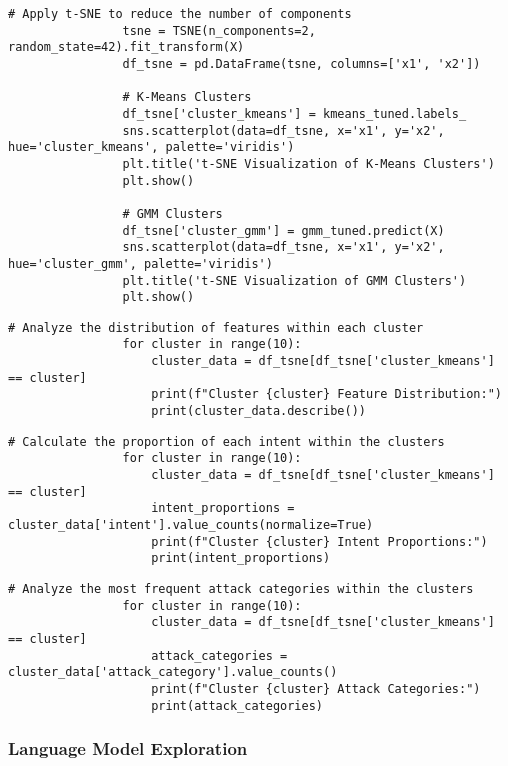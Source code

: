             \begin{lstlisting}[caption={t-SNE Visualization of Clusters}, label={lst:tsne_visualization}]
                # Apply t-SNE to reduce the number of components
                tsne = TSNE(n_components=2, random_state=42).fit_transform(X)
                df_tsne = pd.DataFrame(tsne, columns=['x1', 'x2'])
                
                # K-Means Clusters
                df_tsne['cluster_kmeans'] = kmeans_tuned.labels_
                sns.scatterplot(data=df_tsne, x='x1', y='x2', hue='cluster_kmeans', palette='viridis')
                plt.title('t-SNE Visualization of K-Means Clusters')
                plt.show()
                
                # GMM Clusters
                df_tsne['cluster_gmm'] = gmm_tuned.predict(X)
                sns.scatterplot(data=df_tsne, x='x1', y='x2', hue='cluster_gmm', palette='viridis')
                plt.title('t-SNE Visualization of GMM Clusters')
                plt.show()
            \end{lstlisting}

            \begin{lstlisting}[caption={Feature Distribution Analysis by Cluster}, label={lst:feature_distribution}]
                # Analyze the distribution of features within each cluster
                for cluster in range(10):
                    cluster_data = df_tsne[df_tsne['cluster_kmeans'] == cluster]
                    print(f"Cluster {cluster} Feature Distribution:")
                    print(cluster_data.describe())
            \end{lstlisting}

            \begin{lstlisting}[caption={Intent Proportions Analysis by Cluster}, label={lst:intent_proportions}]
                # Calculate the proportion of each intent within the clusters
                for cluster in range(10):
                    cluster_data = df_tsne[df_tsne['cluster_kmeans'] == cluster]
                    intent_proportions = cluster_data['intent'].value_counts(normalize=True)
                    print(f"Cluster {cluster} Intent Proportions:")
                    print(intent_proportions)
            \end{lstlisting}

            \begin{lstlisting}[caption={Attack Categories Analysis by Cluster}, label={lst:attack_categories}]
                # Analyze the most frequent attack categories within the clusters
                for cluster in range(10):
                    cluster_data = df_tsne[df_tsne['cluster_kmeans'] == cluster]
                    attack_categories = cluster_data['attack_category'].value_counts()
                    print(f"Cluster {cluster} Attack Categories:")
                    print(attack_categories)
            \end{lstlisting}

        \subsubsection{Language Model Exploration}

